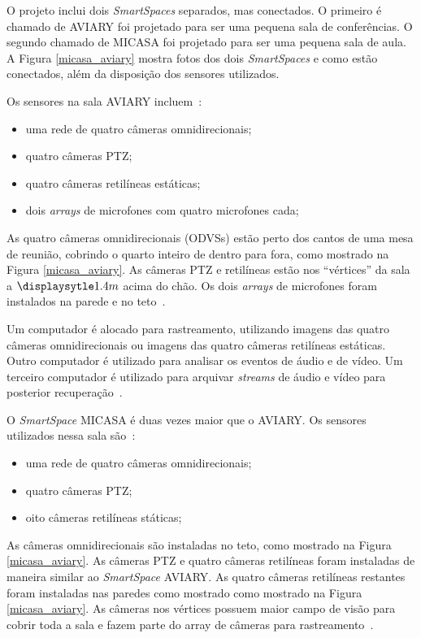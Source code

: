 O projeto inclui dois \textit{SmartSpaces} separados, mas conectados. O primeiro é chamado de AVIARY foi projetado para ser uma pequena sala de conferências. O segundo chamado de MICASA foi projetado para ser uma pequena sala de aula. A Figura \ref{micasa_aviary} mostra fotos dos dois \textit{SmartSpaces} e como estão conectados, além da disposição dos sensores utilizados.

Os sensores na sala AVIARY incluem~\cite{trivedi}:

	\begin{itemize}
		\item uma rede de quatro câmeras omnidirecionais;
		\item quatro câmeras PTZ;
		\item quatro câmeras retilíneas estáticas;
		\item dois \textit{arrays} de microfones com quatro microfones cada;
	\end{itemize}

As quatro câmeras omnidirecionais (ODVSs) estão perto dos cantos de uma mesa de reunião, cobrindo o quarto inteiro de dentro para fora, como mostrado na Figura \ref{micasa_aviary}. As câmeras PTZ e retilíneas estão nos ``vértices'' da sala a $\displaysytle 1.4m$ acima do chão. Os dois \textit{arrays} de microfones foram instalados na parede e no teto~\cite{trivedi}.

Um computador é alocado para rastreamento, utilizando imagens das quatro câmeras omnidirecionais ou imagens das quatro câmeras retilíneas estáticas. Outro computador é utilizado para analisar os eventos de áudio e de vídeo. Um terceiro computador é utilizado para arquivar \textit{streams} de áudio e vídeo para posterior recuperação~\cite{trivedi}.

O \textit{SmartSpace} MICASA é duas vezes maior que o AVIARY. Os sensores utilizados nessa sala são~\cite{trivedi}:
	
	\begin{itemize}
		\item uma rede de quatro câmeras omnidirecionais;
		\item quatro câmeras PTZ;
		\item oito câmeras retilíneas státicas;
	\end{itemize}

As câmeras omnidirecionais são instaladas no teto, como mostrado na Figura \ref{micasa_aviary}. As câmeras PTZ e quatro câmeras retilíneas foram instaladas de maneira similar ao \textit{SmartSpace} AVIARY. As quatro câmeras retilíneas restantes foram instaladas nas paredes como mostrado como mostrado na Figura \ref{micasa_aviary}. As câmeras nos vértices possuem maior campo de visão para cobrir toda a sala e fazem parte do array de câmeras para rastreamento~\cite{trivedi}.

